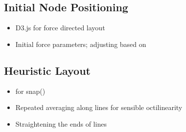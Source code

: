 \subsection{Initial Node Positioning}
\begin{itemize}
	\item D3.js for force directed layout
	\item Initial force parameters; adjusting based on \cite{AutomaticMetroMapLayoutThesis, AutomaticMetroMapLayout}
\end{itemize}

\subsection{Heuristic Layout}
\begin{itemize}
	\item \cite{AutomaticMetroMapLayoutThesis, AutomaticMetroMapLayout} for snap()
	\item Repeated averaging along lines for sensible octilinearity
	\item Straightening the ends of lines
\end{itemize}
